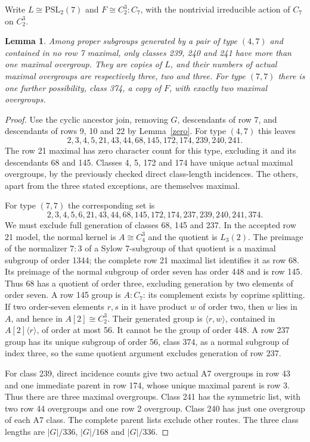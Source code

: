 \documentclass[11pt,a4paper]{article}
\newtheorem{lemma}{Lemma}\newtheorem{theorem}{Theorem}
\begin{document}
Write $L\cong\mathrm{PSL}_2(7)$ and $F\cong C_2^3:C_7$, with the
nontrivial irreducible action of $C_7$ on $C_2^3$.
\begin{lemma}\label{outside}
Among proper subgroups generated by a pair of type $(4,7)$ and
contained in no row 7 maximal, only classes 239, 240 and 241 have
more than one maximal overgroup. They are copies of $L$, and their
numbers of actual maximal overgroups are respectively three, two
and three. For type $(7,7)$ there is one further possibility, class
374, a copy of $F$, with exactly two maximal overgroups.
\end{lemma}
\begin{proof}
Use the cyclic ancestor join, removing $G$, descendants of row 7,
and descendants of rows 9, 10 and 22 by Lemma~\ref{zero}. For type
$(4,7)$ this leaves
\[
2,3,4,5,21,43,44,68,145,172,174,239,240,241.
\]
The row 21 maximal has zero character count for this type, excluding
it and its descendants 68 and 145. Classes 4, 5, 172 and 174 have
unique actual maximal overgroups, by the previously checked direct
class-length incidences. The others, apart from the three stated
exceptions, are themselves maximal.

For type $(7,7)$ the corresponding set is
\[
2,3,4,5,6,21,43,44,68,145,172,174,237,239,240,241,374.
\]
We must exclude full generation of classes 68, 145 and 237.
In the accepted row 21 model, the normal kernel is $A\cong C_4^3$
and the quotient is $L_3(2)$. The preimage of the normalizer $7:3$
of a Sylow 7-subgroup of that quotient is a maximal subgroup of
order 1344; the complete row 21 maximal list identifies it as row 68.
Its preimage of the normal subgroup of order seven has order 448
and is row 145. Thus 68 has a quotient of order three, excluding
generation by two elements of order seven. A row 145 group is
$A:C_7$: its complement exists by coprime splitting. If two
order-seven elements $r,s$ in it have product $w$ of order two,
then $w$ lies in $A$, and hence in $A[2]\cong C_2^3$.
Their generated group is $\langle r,w\rangle$, contained in
$A[2]\langle r\rangle$, of order at most 56. It cannot be the
group of order 448. A row 237 group has its unique subgroup of
order 56, class 374, as a normal subgroup of index three, so the
same quotient argument excludes generation of row 237.

For class 239, direct incidence counts give two actual A7 overgroups
in row 43 and one immediate parent in row 174, whose unique maximal
parent is row 3. Thus there are three maximal overgroups.
Class 241 has the symmetric list, with two row 44 overgroups and
one row 2 overgroup. Class 240 has just one overgroup of each A7
class. The complete parent lists exclude other routes. The three
class lengths are $|G|/336$, $|G|/168$ and $|G|/336$.


\end{proof}
\end{document}
